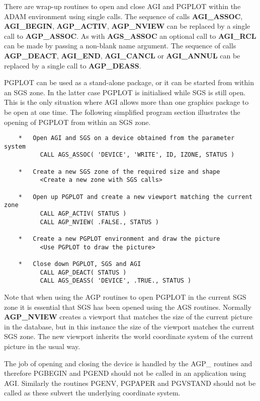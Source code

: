 There are wrap-up routines to open and close AGI and PGPLOT within the
ADAM environment using single calls. The sequence of calls {\bf AGI\_ASSOC},
{\bf AGI\_BEGIN},  {\bf AGP\_ACTIV}, {\bf AGP\_NVIEW} can be replaced by a
single call to {\bf AGP\_ASSOC}. As with {\bf AGS\_ASSOC} an optional call
to {\bf AGI\_RCL} can be made by passing a non-blank name argument.
The sequence of calls {\bf AGP\_DEACT}, {\bf AGI\_END}, {\bf AGI\_CANCL}
or {\bf AGI\_ANNUL} can be replaced by a single call to {\bf AGP\_DEASS}.

PGPLOT can be used as a stand-alone package, or it can be started from
within an SGS zone. In the latter case PGPLOT
is initialised while SGS is still open. This is the only situation where
AGI allows more than one graphics package to be open at one time.
The following simplified program section illustrates the opening of
PGPLOT from within an SGS zone.
\begin{verbatim}
    *   Open AGI and SGS on a device obtained from the parameter system
          CALL AGS_ASSOC( 'DEVICE', 'WRITE', ID, IZONE, STATUS )

    *   Create a new SGS zone of the required size and shape
          <Create a new zone with SGS calls>

    *   Open up PGPLOT and create a new viewport matching the current zone
          CALL AGP_ACTIV( STATUS )
          CALL AGP_NVIEW( .FALSE., STATUS )

    *   Create a new PGPLOT environment and draw the picture
          <Use PGPLOT to draw the picture>

    *   Close down PGPLOT, SGS and AGI
          CALL AGP_DEACT( STATUS )
          CALL AGS_DEASS( 'DEVICE', .TRUE., STATUS )
\end{verbatim}

Note that when using the AGP routines to open PGPLOT in the current SGS
zone it is essential that SGS has been opened using the AGS routines.
Normally {\bf AGP\_NVIEW} creates a viewport that matches the size of
the current picture in the database, but in this instance the size of
the viewport matches the current SGS zone.
The new viewport inherits the world coordinate system of the current picture
in the usual way.

The job of opening and closing the device is handled by the AGP\_ routines
and therefore PGBEGIN and PGEND should not be called in an application
using AGI. Similarly the routines PGENV, PGPAPER and PGVSTAND should not be
called as these subvert the underlying coordinate system.

